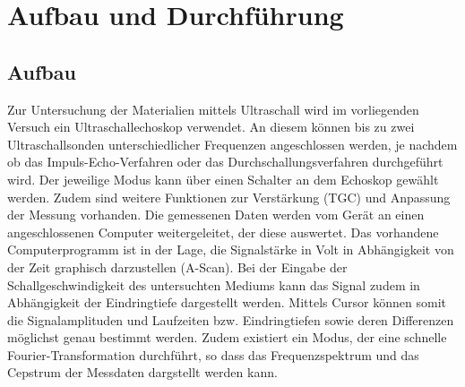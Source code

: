 \section{Aufbau und Durchführung}
\subsection{Aufbau}
\label{sec:Aufbau}
Zur Untersuchung der Materialien mittels Ultraschall wird im vorliegenden Versuch ein Ultraschallechoskop verwendet.
An diesem können bis zu zwei Ultraschallsonden unterschiedlicher Frequenzen angeschlossen werden, je nachdem ob das Impuls-Echo-Verfahren oder das Durchschallungsverfahren durchgeführt wird.
Der jeweilige Modus kann über einen Schalter an dem Echoskop gewählt werden.
Zudem sind weitere Funktionen zur Verstärkung (TGC) und Anpassung der Messung vorhanden.
Die gemessenen Daten werden vom Gerät an einen angeschlossenen Computer weitergeleitet, der diese auswertet.
Das vorhandene Computerprogramm ist in der Lage, die Signalstärke in Volt in Abhängigkeit von der Zeit graphisch darzustellen (A-Scan).
Bei der Eingabe der Schallgeschwindigkeit des untersuchten Mediums kann das Signal zudem in Abhängigkeit der Eindringtiefe dargestellt werden.
Mittels Cursor können somit die Signalamplituden und Laufzeiten bzw. Eindringtiefen sowie deren Differenzen möglichst genau bestimmt werden.
Zudem existiert ein Modus, der eine schnelle Fourier-Transformation durchführt, so dass das Frequenzspektrum und das Cepstrum der Messdaten dargstellt werden kann.
